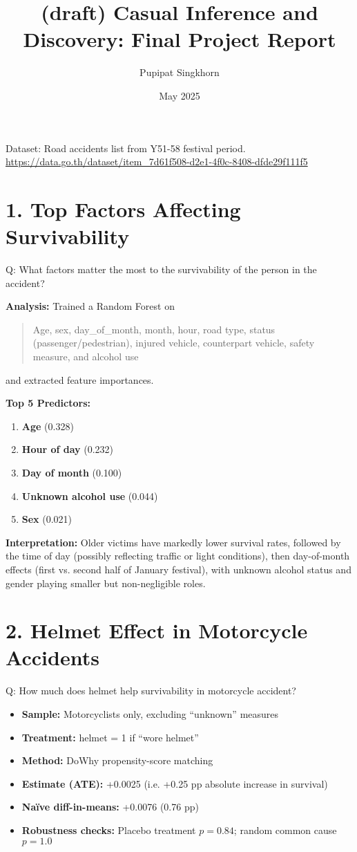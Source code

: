 \documentclass[a4paper]{article}
\title{(draft) Casual Inference and Discovery: Final Project Report}
\author{Pupipat Singkhorn}
\date{May 2025}
\begin{document}
\maketitle

Dataset: Road accidents list from Y51-58 festival period. \url{https://data.go.th/dataset/item_7d61f508-d2e1-4f0c-8408-dfde29f111f5}

\section*{1. Top Factors Affecting Survivability}
Q: What factors matter the most to the survivability of the person in the accident?\

\textbf{Analysis:} Trained a Random Forest on

\begin{quote}
Age, sex, day\_of\_month, month, hour, road type, status (passenger/pedestrian), injured vehicle, counterpart vehicle, safety measure, and alcohol use
\end{quote}

\noindent and extracted feature importances.

\textbf{Top 5 Predictors:}
\begin{enumerate}
    \item \textbf{Age} (0.328)
    \item \textbf{Hour of day} (0.232)
    \item \textbf{Day of month} (0.100)
    \item \textbf{Unknown alcohol use} (0.044)
    \item \textbf{Sex} (0.021)
\end{enumerate}

\textbf{Interpretation:} Older victims have markedly lower survival rates, followed by the time of day (possibly reflecting traffic or light conditions), then day-of-month effects (first vs. second half of January festival), with unknown alcohol status and gender playing smaller but non-negligible roles.

\section*{2. Helmet Effect in Motorcycle Accidents}
Q: How much does helmet help survivability in motorcycle accident?

\begin{itemize}
    \item \textbf{Sample:} Motorcyclists only, excluding ``unknown'' measures
    \item \textbf{Treatment:} helmet = 1 if ``wore helmet''
    \item \textbf{Method:} DoWhy propensity-score matching
    \item \textbf{Estimate (ATE):} +0.0025 (i.e. +0.25 pp absolute increase in survival)
    \item \textbf{Naïve diff-in-means:} +0.0076 (0.76 pp)
    \item \textbf{Robustness checks:} Placebo treatment $p = 0.84$; random common cause $p = 1.0$
\end{itemize}
\end{document}
